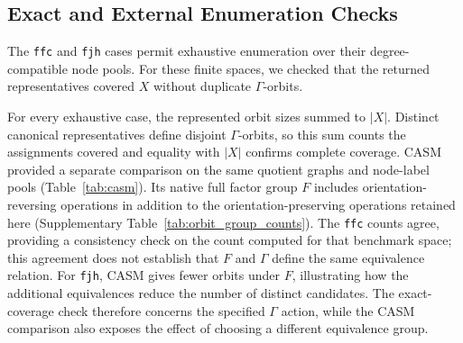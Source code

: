 \documentclass[a5paper, 10pt]{article}
\begin{document}
\subsection{Exact and External Enumeration Checks}

The \texttt{ffc} and \texttt{fjh} cases permit exhaustive enumeration over their degree-compatible node pools. For these finite spaces, we checked that the returned representatives covered $X$ without duplicate $\Gamma$-orbits.

For every exhaustive case, the represented orbit sizes summed to $|X|$. Distinct canonical representatives define disjoint $\Gamma$-orbits, so this sum counts the assignments covered and equality with $|X|$ confirms complete coverage. CASM provided a separate comparison on the same quotient graphs and node-label pools (Table~\ref{tab:casm}). %
Its native full factor group $F$ includes orientation-reversing operations in addition to the orientation-preserving operations retained here (Supplementary Table~\ref{tab:orbit_group_counts}). The \texttt{ffc} counts agree, providing a consistency check on the count computed for that benchmark space; this agreement does not establish that $F$ and $\Gamma$ define the same equivalence relation. For \texttt{fjh}, CASM gives fewer orbits under $F$, illustrating how the additional equivalences reduce the number of distinct candidates. The exact-coverage check therefore concerns the specified $\Gamma$ action, while the CASM comparison also exposes the effect of choosing a different equivalence group.
\end{document}

